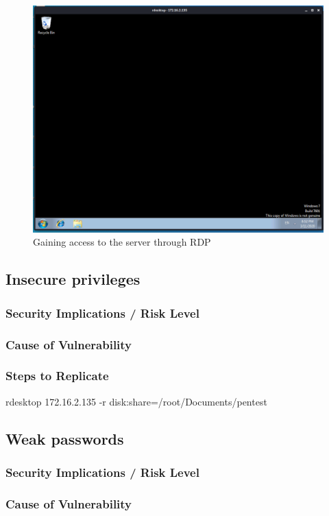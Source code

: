 \documentclass{report}
\begin{document}
\begin{figure}[!htb]
	\centering
	\includegraphics[scale=0.4]{img/rdp2.png}
	\caption{Gaining access to the server through RDP}
\end{figure}
\subsection{Insecure privileges}
\subsubsection{Security Implications / Risk Level}
\subsubsection{Cause of Vulnerability}
\subsubsection{Steps to Replicate}
rdesktop 172.16.2.135 -r disk:share=/root/Documents/pentest
\subsection{Weak passwords}
\subsubsection{Security Implications / Risk Level}
\subsubsection{Cause of Vulnerability}
\end{document}
